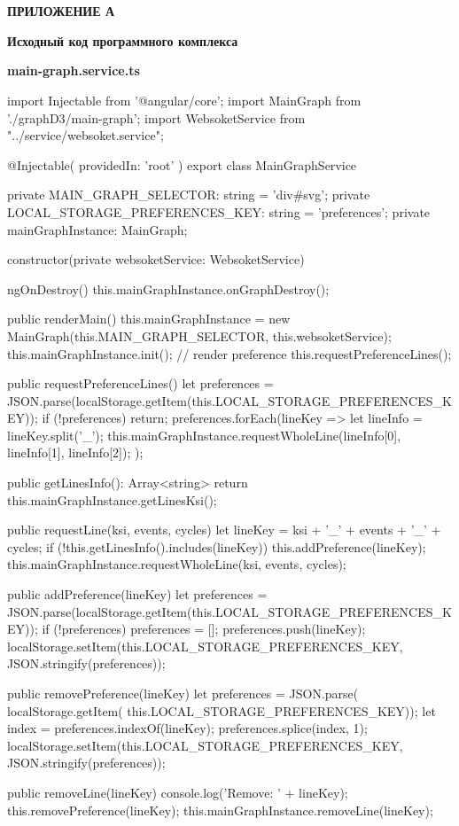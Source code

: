 \chapter*{}
\begin{flushright}
	\textbf{ПРИЛОЖЕНИЕ А}
\end{flushright}
\begin{center}
	\textbf{Исходный код программного комплекса}
\end{center}

\textbf{main-graph.service.ts}

\begin{spverbatim}
import {Injectable} from '@angular/core';
import {MainGraph} from './graphD3/main-graph';
import {WebsoketService} from "../service/websoket.service";

@Injectable({
providedIn: 'root'
})
export class MainGraphService {

private MAIN_GRAPH_SELECTOR: string = 'div#svg';
private LOCAL_STORAGE_PREFERENCES_KEY: string = 'preferences';
private mainGraphInstance: MainGraph;

constructor(private websoketService: WebsoketService) {
}

ngOnDestroy() {
this.mainGraphInstance.onGraphDestroy();
}

public renderMain() {
this.mainGraphInstance = new MainGraph(this.MAIN_GRAPH_SELECTOR, this.websoketService);
this.mainGraphInstance.init();
// render preference
this.requestPreferenceLines();
}

public requestPreferenceLines() {
let preferences = JSON.parse(localStorage.getItem(this.LOCAL_STORAGE_PREFERENCES_KEY));
if (!preferences) {
return;
}
preferences.forEach(lineKey => {
let lineInfo = lineKey.split('_');
this.mainGraphInstance.requestWholeLine(lineInfo[0], lineInfo[1], lineInfo[2]);
});
}

public getLinesInfo(): Array<string> {
return this.mainGraphInstance.getLinesKsi();
}

public requestLine(ksi, events, cycles) {
let lineKey = ksi + '_' + events + '_' + cycles;
if (!this.getLinesInfo().includes(lineKey)) {
this.addPreference(lineKey);
this.mainGraphInstance.requestWholeLine(ksi, events, cycles);
}
}

public addPreference(lineKey) {
let preferences = JSON.parse(localStorage.getItem(this.LOCAL_STORAGE_PREFERENCES_KEY));
if (!preferences) {
preferences = [];
}
preferences.push(lineKey);
localStorage.setItem(this.LOCAL_STORAGE_PREFERENCES_KEY, JSON.stringify(preferences));
}

public removePreference(lineKey) {
	let preferences =
	 JSON.parse(
	 	localStorage.getItem(
	 		this.LOCAL_STORAGE_PREFERENCES_KEY));
	let index = preferences.indexOf(lineKey);
	preferences.splice(index, 1);
	localStorage.setItem(this.LOCAL_STORAGE_PREFERENCES_KEY, JSON.stringify(preferences));
}

public removeLine(lineKey) {
	console.log('Remove: ' + lineKey);
	this.removePreference(lineKey);
	this.mainGraphInstance.removeLine(lineKey);
}


}
\end{spverbatim}

